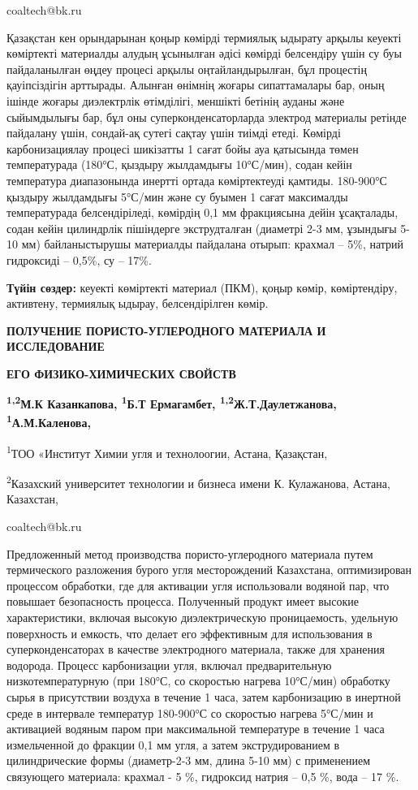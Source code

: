 coaltech@bk.ru

Қазақстан кен орындарынан қоңыр көмірді термиялық ыдырату арқылы кеуекті
көміртекті материалды алудың ұсынылған әдісі көмірді белсендіру үшін су
буы пайдаланылған өңдеу процесі арқылы оңтайландырылған, бұл процестің
қауіпсіздігін арттырады. Алынған өнімнің жоғары сипаттамалары бар, оның
ішінде жоғары диэлектрлік өтімділігі, меншікті бетінің ауданы және
сыйымдылығы бар, бұл оны суперконденсаторларда электрод материалы
ретінде пайдалану үшін, сондай-ақ сутегі сақтау үшін тиімді етеді.
Көмірді карбонизациялау процесі шикізатты 1 сағат бойы ауа қатысында
төмен температурада (180°С, қыздыру жылдамдығы 10°С/мин), содан кейін
температура диапазонында инертті ортада көміртектеуді қамтиды. 180-900°С
қыздыру жылдамдығы 5°С/мин және су буымен 1 сағат максималды
температурада белсендіріледі, көмірдің 0,1 мм фракциясына дейін
ұсақталады, содан кейін цилиндрлік пішіндерге экструдталған (диаметрі
2-3 мм, ұзындығы 5-10 мм) байланыстырушы материалды пайдалана отырып:
крахмал -- 5\%, натрий гидроксиді -- 0,5\%, су -- 17\%.

{\bfseries Түйін сөздер:} кеуекті көміртекті материал (ПКМ), қоңыр көмір,
көміртендіру, активтену, термиялық ыдырау, белсендірілген көмір.

{\bfseries ПОЛУЧЕНИЕ ПОРИСТО-УГЛЕРОДНОГО МАТЕРИАЛА И ИССЛЕДОВАНИЕ}

{\bfseries ЕГО ФИЗИКО-ХИМИЧЕСКИХ СВОЙСТВ}

{\bfseries \textsuperscript{1,2}М.К Казанкапова, \textsuperscript{1}Б.Т
Ермагамбет, \textsuperscript{1,2}Ж.Т.Даулетжанова,
\textsuperscript{1}А.М.Каленова,}

\textsuperscript{1}ТОО «Институт Химии угля и технолоогии, Астана,
Қазақстан,

\textsuperscript{2}Казахский университет технологии и бизнеса имени К.
Кулажанова, Астана, Казахстан,

coaltech@bk.ru

Предложенный метод производства пористо-углеродного материала путем
термического разложения бурого угля месторождений Казахстана,
оптимизирован процессом обработки, где для активации угля использовали
водяной пар, что повышает безопасность процесса. Полученный продукт
имеет высокие характеристики, включая высокую диэлектрическую
проницаемость, удельную поверхность и емкость, что делает его
эффективным для использования в суперконденсаторах в качестве
электродного материала, также для хранения водорода. Процесс
карбонизации угля, включал предварительную низкотемпературную (при
180°С, со скоростью нагрева 10°С/мин) обработку сырья в присутствии
воздуха в течение 1 часа, затем карбонизацию в инертной среде в
интервале температур 180-900°С со скоростью нагрева 5°С/мин и активацией
водяным паром при максимальной температуре в течение 1 часа измельченной
до фракции 0,1 мм угля, а затем экструдированием в цилиндрические формы
(диаметр-2-3 мм, длина 5-10 мм) с применением связующего материала:
крахмал - 5 \%, гидроксид натрия -- 0,5 \%, вода -- 17 \%.

